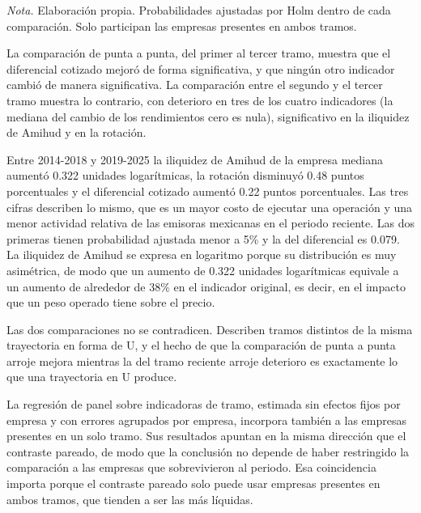 \emph{Nota.} Elaboración propia. Probabilidades ajustadas por Holm dentro de cada comparación. Solo participan las empresas presentes en ambos tramos.

La comparación de punta a punta, del primer al tercer tramo, muestra que el diferencial cotizado mejoró de forma significativa, y que ningún otro indicador cambió de manera significativa. La comparación entre el segundo y el tercer tramo muestra lo contrario, con deterioro en tres de los cuatro indicadores (la mediana del cambio de los rendimientos cero es nula), significativo en la iliquidez de Amihud y en la rotación.

Entre 2014-2018 y 2019-2025 la iliquidez de Amihud de la empresa mediana aumentó 0.322 unidades logarítmicas, la rotación disminuyó 0.48 puntos porcentuales y el diferencial cotizado aumentó 0.22 puntos porcentuales. Las tres cifras describen lo mismo, que es un mayor costo de ejecutar una operación y una menor actividad relativa de las emisoras mexicanas en el periodo reciente. Las dos primeras tienen probabilidad ajustada menor a 5\% y la del diferencial es 0.079. La iliquidez de Amihud se expresa en logaritmo porque su distribución es muy asimétrica, de modo que un aumento de 0.322 unidades logarítmicas equivale a un aumento de alrededor de 38\% en el indicador original, es decir, en el impacto que un peso operado tiene sobre el precio.

Las dos comparaciones no se contradicen. Describen tramos distintos de la misma trayectoria en forma de U, y el hecho de que la comparación de punta a punta arroje mejora mientras la del tramo reciente arroje deterioro es exactamente lo que una trayectoria en U produce.

La regresión de panel sobre indicadoras de tramo, estimada sin efectos fijos por empresa y con errores agrupados por empresa, incorpora también a las empresas presentes en un solo tramo. Sus resultados apuntan en la misma dirección que el contraste pareado, de modo que la conclusión no depende de haber restringido la comparación a las empresas que sobrevivieron al periodo. Esa coincidencia importa porque el contraste pareado solo puede usar empresas presentes en ambos tramos, que tienden a ser las más líquidas.



